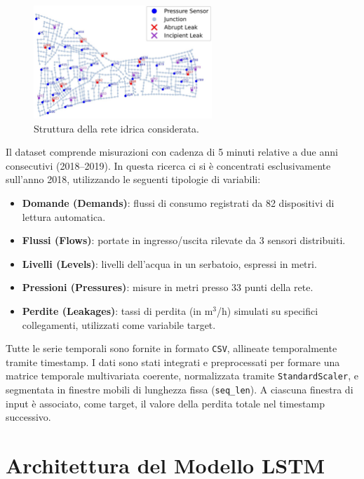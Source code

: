 \documentclass{article}
\begin{document}
\begin{figure}[htbp]
    \centering
    \includegraphics[width=0.6\textwidth]{img/struttura della rete.png}
    \caption{Struttura della rete idrica considerata.}
    \label{fig:network_structure}
\end{figure}

Il dataset comprende misurazioni con cadenza di 5 minuti relative a due anni consecutivi (2018--2019). 
In questa ricerca ci si è concentrati esclusivamente sull'anno 2018, utilizzando le seguenti tipologie 
di variabili:

\begin{itemize}
    \item \textbf{Domande (Demands)}: flussi di consumo registrati da 82 dispositivi di lettura automatica.
    \item \textbf{Flussi (Flows)}: portate in ingresso/uscita rilevate da 3 sensori distribuiti.
    \item \textbf{Livelli (Levels)}: livelli dell’acqua in un serbatoio, espressi in metri.
    \item \textbf{Pressioni (Pressures)}: misure in metri presso 33 punti della rete.
    \item \textbf{Perdite (Leakages)}: tassi di perdita (in m$^3$/h) simulati su specifici collegamenti, utilizzati come variabile target.
\end{itemize}

Tutte le serie temporali sono fornite in formato \texttt{CSV}, allineate temporalmente
tramite timestamp. I dati sono stati integrati e preprocessati per formare una matrice 
temporale multivariata coerente, normalizzata tramite \texttt{StandardScaler}, e segmentata 
in finestre mobili di lunghezza fissa (\texttt{seq\_len}). A ciascuna finestra di input è 
associato, come target, il valore della perdita totale nel timestamp successivo.

\section{Architettura del Modello LSTM}
\end{document}
